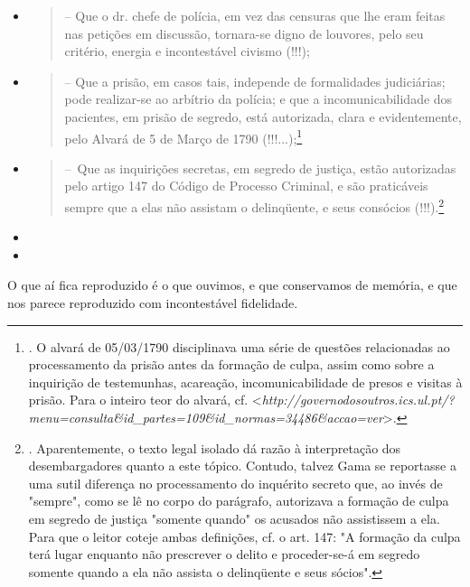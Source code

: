 \begin{itemize}
\item
  \begin{quote}
  -- Que o dr. chefe de polícia, em vez das censuras que lhe eram feitas
  nas petições em discussão, tornara-se digno de louvores, pelo seu
  critério, energia e incontestável civismo (!!!);
  \end{quote}
\item
  \begin{quote}
  -- Que a prisão, em casos tais, independe de formalidades judiciárias;
  pode realizar-se ao arbítrio da polícia; e que a incomunicabilidade
  dos pacientes, em prisão de segredo, está autorizada, clara e
  evidentemente, pelo Alvará de 5 de Março de 1790 (!!!...);\footnote{.
    O alvará de 05/03/1790 disciplinava uma série de questões
    relacionadas ao processamento da prisão antes da formação de culpa,
    assim como sobre a inquirição de testemunhas, acareação,
    incomunicabilidade de presos e visitas à prisão. Para o inteiro teor
    do alvará, cf.
    \textless{}\emph{http://governodosoutros.ics.ul.pt/?menu=consulta\&id\_partes=109\&id\_normas=34486\&accao=ver}\textgreater{}.}
  \end{quote}
\item
  \begin{quote}
  --~Que as inquirições secretas, em segredo de justiça, estão
  autorizadas pelo artigo 147 do Código de Processo Criminal, e são
  praticáveis sempre que a elas não assistam o delinqüente, e seus
  consócios (!!!).\footnote{. Aparentemente, o texto legal isolado dá
    razão à interpretação dos desembargadores quanto a este tópico.
    Contudo, talvez Gama se reportasse a uma sutil diferença no
    processamento do inquérito secreto que, ao invés de "sempre", como
    se lê no corpo do parágrafo, autorizava a formação de culpa em
    segredo de justiça "somente quando" os acusados não assistissem a
    ela. Para que o leitor coteje ambas definições, cf. o art. 147: "A
    formação da culpa terá lugar enquanto não prescrever o delito e
    proceder-se-á em segredo somente quando a ela não assista o
    delinqüente e seus sócios".}
  \end{quote}
\item
\item
\end{itemize}

O que aí fica reproduzido é o que ouvimos, e que conservamos de memória,
e que nos parece reproduzido com incontestável fidelidade.

